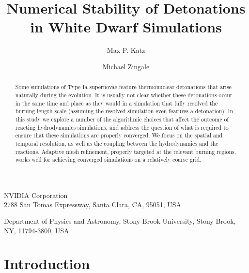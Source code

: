 \documentclass[twocolumn,numberedappendix]{../aastex62}
\begin{document}
\title{Numerical Stability of Detonations in White Dwarf Simulations}


\author{Max P. Katz}
\affiliation
{
  NVIDIA Corporation \\
  2788 San Tomas Expressway, Santa Clara, CA, 95051, USA
}

\author{Michael Zingale}
\affiliation
{
  Department of Physics and Astronomy, Stony Brook University, Stony Brook, NY, 11794-3800, USA
}



\begin{abstract}
Some simulations of Type Ia supernovae feature thermonuclear detonations that
arise naturally during the evolution. It is usually not clear whether these
detonations occur in the same time and place as they would in a simulation
that fully resolved the burning length scale (assuming the resolved simulation
even features a detonation). In this study we explore a number of the algorithmic
choices that affect the outcome of reacting hydrodynamics simulations, and address
the question of what is required to ensure that these simulations are properly
converged. We focus on the spatial and temporal resolution, as well as the coupling
between the hydrodynamics and the reactions. Adaptive mesh refinement, properly
targeted at the relevant burning regions, works well for achieving converged simulations
on a relatively coarse grid.
\end{abstract}

\section{Introduction}
\label{sec:introduction}
\end{document}
